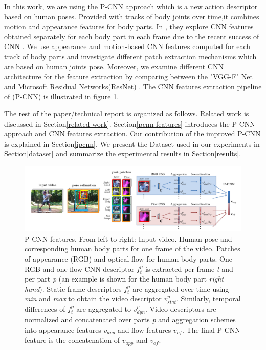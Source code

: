 \documentclass[10pt,twocolumn,letterpaper]{article}
\begin{document}
In this work, we are using the P-CNN approach which is a new action descriptor based on human poses. Provided with tracks of body joints over time,it combines motion and appearance features for
body parts. In \cite{cheron2015p}, they explore CNN features obtained
separately for each body part in each frame due to the recent success of CNN \cite{krizhevsky2012imagenet,lecun1998gradient}. We use
appearance and motion-based CNN features computed for each track of body parts and investigate different patch extraction mechanisms which are based on human joints pose. Moreover, we examine different CNN architecture for the feature extraction by comparing between the "VGG-F" Net \cite{chatfield2014return} and Microsoft Residual Networks(ResNet) \cite{he2015deep}. The CNN features extraction pipeline of (P-CNN) is illustrated in figure \ref{fig:pcnn}.

The rest of the paper/technical report is organized as follows. Related work is discussed in Section\ref{related-work}. Section\ref{pcnn-features} introduces the P-CNN approach and CNN features extraction. Our contribution of the improved P-CNN is explained in Section\ref{ipcnn}. We present the Dataset used in our experiments in Section\ref{dataset} and summarize the experimental results in Section\ref{results}.

\begin{figure}
	\begin{center}
		\includegraphics[width=1.0\linewidth]{P-CNN}
	\end{center}
	\caption{P-CNN features. From left to right: Input video. Human pose and corresponding human body parts for one frame
		of the video. Patches of appearance (RGB) and optical flow for human body parts. One RGB and one flow CNN descriptor $f^{p}_{t}$ is extracted per frame \textit{t} and per part \textit{p} (an example is shown for the human body part \textit{right hand}). Static frame descriptors $f^{p}_{t}$ are aggregated over time using \textit{min} and \textit{max} to obtain the video descriptor $v^{p}_{stat}$. Similarly, temporal differences of $f^{p}_{t}$ are aggregated to $v^{p}_{dyn}$. Video descriptors are normalized and concatenated over parts \textit{p} and aggregation schemes into appearance features $v_{app}$ and flow features $v_{of}$. The final P-CNN feature is the concatenation of $v_{app}$ and $v_{of}$. }
	\label{fig:pcnn}
\end{figure}
\end{document}
